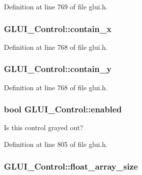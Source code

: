 Definition at line 769 of file glui.\+h.

\hypertarget{class_g_l_u_i___control_aa02b20473b2d00e5b95bf36ff941e5bf}{
\subsubsection[{contain\+\_\+x}]{ G\+L\+U\+I\+\_\+\+Control\+::contain\+\_\+x}}\label{class_g_l_u_i___control_aa02b20473b2d00e5b95bf36ff941e5bf}


Definition at line 768 of file glui.\+h.

\hypertarget{class_g_l_u_i___control_a6327d4d71e9368bf238c6fddd958649e}{
\subsubsection[{contain\+\_\+y}]{ G\+L\+U\+I\+\_\+\+Control\+::contain\+\_\+y}}\label{class_g_l_u_i___control_a6327d4d71e9368bf238c6fddd958649e}


Definition at line 768 of file glui.\+h.

\hypertarget{class_g_l_u_i___control_a834202682d00a31a2141eae6709d37e1}{
\subsubsection[{enabled}]{\setlength{\rightskip}{0pt plus 5cm}bool G\+L\+U\+I\+\_\+\+Control\+::enabled}}\label{class_g_l_u_i___control_a834202682d00a31a2141eae6709d37e1}
Is this control grayed out? 

Definition at line 805 of file glui.\+h.

\hypertarget{class_g_l_u_i___control_a504f6aff85729e665fa8664d170d9878}{
\subsubsection[{float\+\_\+array\+\_\+size}]{ G\+L\+U\+I\+\_\+\+Control\+::float\+\_\+array\+\_\+size}}\label{class_g_l_u_i___control_a504f6aff85729e665fa8664d170d9878}



